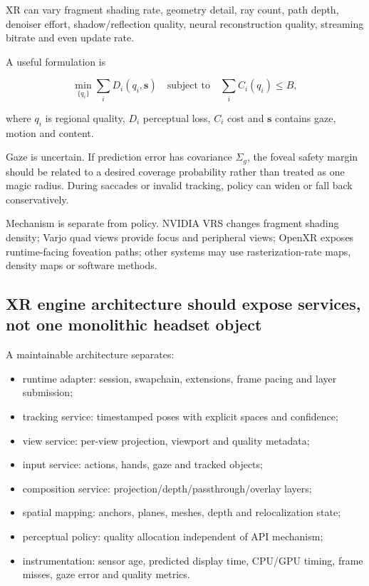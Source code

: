 XR can vary fragment shading rate, geometry detail, ray count, path depth, denoiser effort, shadow/reflection quality, neural reconstruction quality, streaming bitrate and even update rate.

A useful formulation is

\[
\min_{\{q_i\}}\sum_i D_i(q_i,\mathbf{s})
\quad\text{subject to}\quad
\sum_i C_i(q_i)\le B,
\]

where \(q_i\) is regional quality, \(D_i\) perceptual loss, \(C_i\) cost and \(\mathbf s\) contains gaze, motion and content.

Gaze is uncertain. If prediction error has covariance \(\Sigma_g\), the foveal safety margin should be related to a desired coverage probability rather than treated as one magic radius. During saccades or invalid tracking, policy can widen or fall back conservatively.

Mechanism is separate from policy. NVIDIA VRS changes fragment shading density; Varjo quad views provide focus and peripheral views; OpenXR exposes runtime-facing foveation paths; other systems may use rasterization-rate maps, density maps or software methods.

\subsection{XR engine architecture should expose services, not one monolithic headset object}\label{04-visual-computing-ii-ch035-xr-engine-architecture-should-expose-services-not-one-monolithic-headset-object}

A maintainable architecture separates:

\begin{itemize}
\tightlist
\item
  runtime adapter: session, swapchain, extensions, frame pacing and layer submission;
\item
  tracking service: timestamped poses with explicit spaces and confidence;
\item
  view service: per-view projection, viewport and quality metadata;
\item
  input service: actions, hands, gaze and tracked objects;
\item
  composition service: projection/depth/passthrough/overlay layers;
\item
  spatial mapping: anchors, planes, meshes, depth and relocalization state;
\item
  perceptual policy: quality allocation independent of API mechanism;
\item
  instrumentation: sensor age, predicted display time, CPU/GPU timing, frame misses, gaze error and quality metrics.
\end{itemize}

